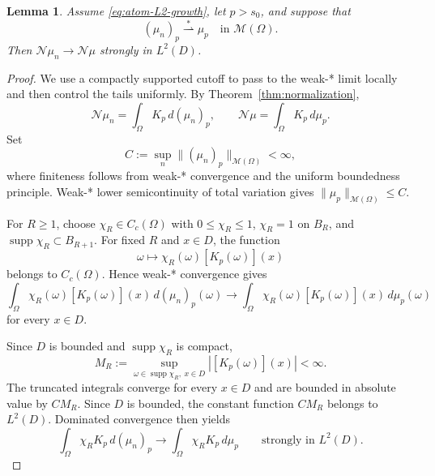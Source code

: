 \documentclass[11pt]{amsart}
\newtheorem{lemma}[theorem]{Lemma}
\theoremstyle{definition}
\theoremstyle{remark}
\DeclareMathOperator{\supp}{supp}
\begin{document}
\begin{lemma}
\label{lem:value-continuity}
Assume \eqref{eq:atom-L2-growth}, let $p>s_0$, and suppose that
\begin{equation*}
	(\mu_n)_p\overset{*}{\rightharpoonup}\mu_p
	\quad\text{in }\mathcal M(\Omega).
\end{equation*}
Then $\mathcal N\mu_n\to\mathcal N\mu$ strongly in $L^2(D)$.
\end{lemma}
\begin{proof}
We use a compactly supported cutoff to pass to the weak-* limit locally and
then control the tails uniformly.  By Theorem~\ref{thm:normalization},
\begin{equation*}
	\mathcal N\mu_n=\int_\Omega K_p\,d(\mu_n)_p,
	\qquad
	\mathcal N\mu=\int_\Omega K_p\,d\mu_p.
\end{equation*}
Set
\begin{equation*}
	C:=\sup_n\|(\mu_n)_p\|_{\mathcal M(\Omega)}<\infty,
\end{equation*}
where finiteness follows from weak-* convergence and the uniform boundedness
principle.
Weak-* lower semicontinuity of total variation gives
$\|\mu_p\|_{\mathcal M(\Omega)}\le C$.

For $R\ge1$, choose $\chi_R\in C_c(\Omega)$ with
$0\le\chi_R\le1$, $\chi_R=1$ on $B_R$, and
$\supp\chi_R\subset B_{R+1}$.  For fixed $R$ and $x\in D$, the function
\begin{equation*}
	\omega\longmapsto\chi_R(\omega)[K_p(\omega)](x)
\end{equation*}
belongs to $C_c(\Omega)$.  Hence weak-* convergence gives
\begin{equation*}
	\int_\Omega\chi_R(\omega)[K_p(\omega)](x)\,d(\mu_n)_p(\omega)
	\longrightarrow
	\int_\Omega\chi_R(\omega)[K_p(\omega)](x)\,d\mu_p(\omega)
\end{equation*}
for every $x\in D$.

Since $D$ is bounded and $\supp\chi_R$ is compact,
\begin{equation*}
	M_R:=\sup_{\omega\in\supp\chi_R,\ x\in D}
	|[K_p(\omega)](x)|<\infty.
\end{equation*}
The truncated integrals converge for every $x\in D$ and are bounded in
absolute value by $CM_R$. Since $D$ is bounded, the constant function
$CM_R$ belongs to $L^2(D)$. Dominated convergence then yields
\begin{equation*}
	\int_\Omega\chi_RK_p\,d(\mu_n)_p
	\longrightarrow
	\int_\Omega\chi_RK_p\,d\mu_p
	\qquad\text{strongly in }L^2(D).
\end{equation*}


\end{proof}
\end{document}
